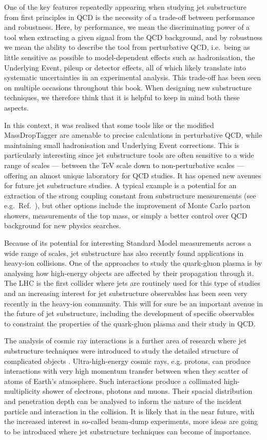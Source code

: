 One of the key features repeatedly appearing when studying jet
substructure from first principles in QCD is the necessity of a
trade-off between performance and robustness. Here, by performance, we
mean the discriminating power of a tool when extracting a given signal
from the QCD background, and by robustness we mean the ability to
describe the tool from perturbative QCD, i.e.\ being as little
sensitive as possible to model-dependent effects such as
hadronisation, the Underlying Event, pileup or detector effects, all
of which likely translate into systematic uncertainties in an
experimental analysis.
%
This trade-off has been seen on multiple occasions throughout this
book.
%
When designing new substructure techniques, we therefore think that it
is helpful to keep in mind both these aspects.

In this context, it was realised that some tools like
\SD or the modified MassDropTagger are amenable to precise
calculations in perturbative QCD, while maintaining small
hadronisation and Underlying Event corrections.
%
This is particularly interesting since jet substructure tools are
often sensitive to a wide range of scales --- between the TeV scale
down to non-perturbative scales --- offering an almost unique
laboratory for QCD studies.
%
It has opened new avenues for future jet
substructure studies. 
%
 A typical example is a potential for
an extraction of the strong coupling constant from substructure
measurements (see e.g.\ Ref.~\cite{Bendavid:2018nar}), but other
options include the improvement of Monte Carlo parton showers,
measurements of the top mass, or simply a better control over QCD
background for new physics searches.

Because of its potential for interesting Standard Model measurements
across a wide range of scales, jet substructure has also recently
found applications in heavy-ion collisions.
%
One of the approaches to study the quark-gluon plasma is by analysing
how high-energy objects are affected by their propagation through it.
%
The LHC is the first collider where jets are routinely used for this
type of studies and an increasing interest for jet substructure
observables has been seen very recently in the heavy-ion community.
%
This will for sure be an important avenue in the future of jet
substructure, including the development of specific observables to
constraint the properties of the quark-gluon plasma and their study in
QCD.

The analysis of cosmic ray interactions is a further area of research
where jet substructure techniques were introduced to study the
detailed structure of complicated objects \cite{Brooijmans:2016lfv,
  Aab:2018jpg}. Ultra-high-energy cosmic rays, e.g. protons, can
produce interactions with very high momentum transfer between when
they scatter of atoms of Earth's atmosphere. Such interactions produce
a collimated high-multiplicity shower of electrons, photons and
muons. Their spacial distribution and penetration depth can be
analysed to inform the nature of the incident particle and interaction
in the collision. It is likely that in the near future, with the
increased interest in so-called beam-dump experiments, more ideas are
going to be introduced where jet substructure techniques can become of
importance.

